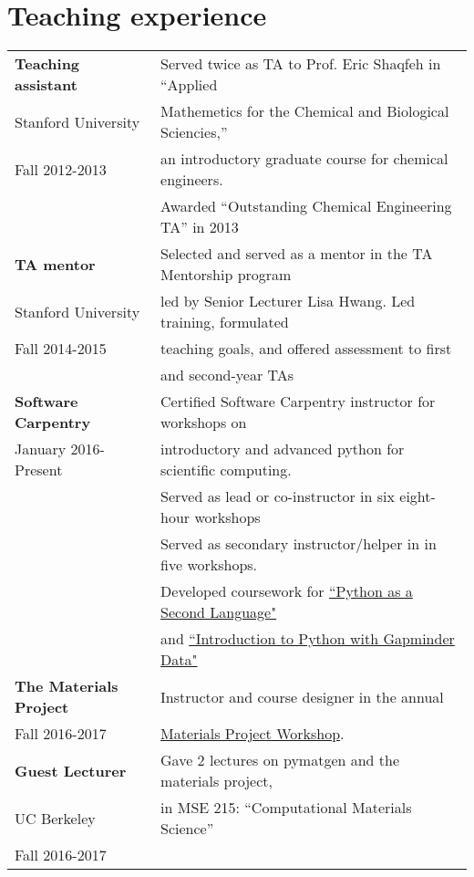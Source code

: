\documentclass[a4paper,10pt]{article}
\begin{document}
\section{Teaching experience}
\begin{tabular}{ll}
  \textbf{Teaching assistant}
 & Served twice as TA to Prof. Eric Shaqfeh in ``Applied  \\
  Stanford University &Mathemetics for the Chemical and Biological Sciencies,'' \\
 Fall 2012-2013 &an introductory graduate course for chemical engineers. \vspace{0.05in} \\
 &Awarded ``Outstanding Chemical Engineering TA'' in 2013\vspace{0.13in}\\

  \textbf{TA mentor}
 & Selected and served as a mentor in the TA Mentorship program \\
  Stanford University & led by Senior Lecturer Lisa Hwang. Led training, formulated  \\
 Fall 2014-2015 & teaching goals, and offered assessment to first  \\
& and second-year TAs \vspace{0.13in}\\

 \textbf{Software Carpentry}
  &Certified Software Carpentry instructor for workshops on  \\
 January 2016-Present &introductory and advanced python for scientific computing. \vspace{0.05in} \\
 &Served as lead or co-instructor in six eight-hour workshops \vspace{0.05in} \\ 
 &Served as secondary instructor/helper in in five workshops. \vspace{0.05in} \\
 &Developed coursework for \href{https://swcarpentry.github.io/python-second-language/}{``Python as a Second Language"} \\
 & and \href{https://swcarpentry.github.io/python-novice-gapminder/}{``Introduction to Python with Gapminder Data"}\vspace{0.13in} \\ 

\textbf{The Materials Project} & Instructor and course designer in the annual \\
Fall 2016-2017 & \href{https://github.com/materialsproject/workshop-2017}{Materials Project Workshop}. \vspace{0.13in}\\

\textbf{Guest Lecturer} & Gave 2 lectures on pymatgen and the materials project, \\ 
UC Berkeley & in MSE 215: ``Computational Materials Science'' \\
Fall 2016-2017 & 
 \end{tabular} \vspace{0.2in}
\end{document}
